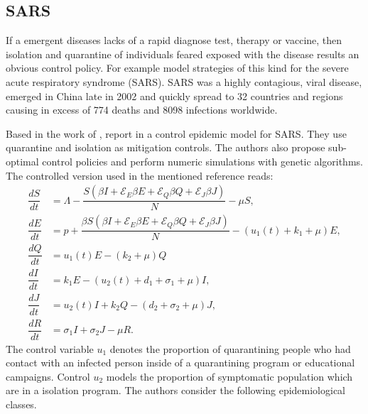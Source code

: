 
\subsection*{SARS}
  If a emergent diseases lacks of a rapid diagnose test, therapy or vaccine,
then isolation and quarantine of individuals feared exposed with the disease
results an obvious control policy. For example \citet{Gumel2004} model
strategies of this kind for the severe acute respiratory syndrome (SARS).
SARS was a highly contagious, viral disease, emerged in China late in 
\num{2002}  and quickly spread to \num{32} countries and regions causing in 
excess of \num{774} deaths and \num{8098} infections worldwide.

Based in the work of \citet{Gumel2004}, \citeauthor{Yan2008} report in 
\cite{Yan2008} a control epidemic model for SARS. They use quarantine and 
isolation as mitigation controls. The authors also propose sub-optimal control 
policies and perform numeric simulations with genetic algorithms. The 
controlled version used in the mentioned 
reference reads:
%
%
\begin{equation}\label{eqn:sars_model}
	\begin{aligned}
		\dfrac{dS}{dt} &=
			\Lambda 
			-\dfrac{
				S
				\left(
					\beta I 
					+ \mathcal{E}_E  \beta E
					+ \mathcal{E}_Q  \beta Q
					+ \mathcal{E}_J  \beta J
				\right)
			}{N}
			- \mu S,
		\\
		\dfrac{dE}{dt} &=
			p +
			\dfrac{
				\beta S
				\left(
					\beta I 
						+ \mathcal{E}_E \beta E
						+ \mathcal{E}_Q \beta Q
						+ \mathcal{E}_J \beta J
				\right)
			}{N}
			-(
				u_1(t) + k_1 + \mu
			)E,
		\\
		\dfrac{dQ}{dt} &=
			u_1(t) E 
			- (k_2 + \mu) Q
		\\
		\dfrac{dI}{dt} &=
			k_1 E 
			-(u_2(t) + d_1  + \sigma_1 + \mu) I,
		\\
		\dfrac{dJ}{dt} &=
			u_2(t) I 
			+ k_2 Q
			- (d_2 + \sigma_2 + \mu) J,
		\\
		\dfrac{dR}{dt} &=
			\sigma_1 I
			+\sigma_2 J
			- \mu R.
	\end{aligned}
\end{equation}
The control variable $u_1$ denotes the proportion of quarantining people 
who had contact with an infected person inside of a quarantining program or
educational campaigns. Control $u_2$ models the proportion of symptomatic 
population which are in a isolation program. The authors consider the 
following epidemiological classes.
